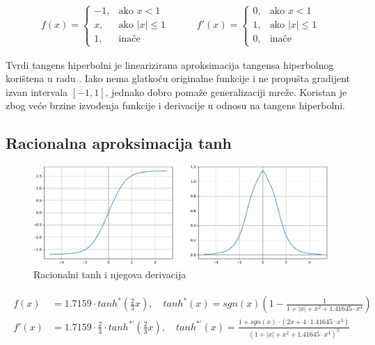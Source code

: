 \documentclass[times, utf8, numeric, diplomski]{fer}
\begin{document}
\begin{equation}
\label{eq:htanh}
\begin{split}
f(x) =
\begin{cases}
-1,	 		& \text{ako } x < 1 \\
x,	 		& \text{ako } |x| \leq 1 \\
1,	& \text{inače}
\end{cases}
\end{split}
\qquad
\begin{split}
f'(x) =
\begin{cases}
0,	 		& \text{ako } x < 1 \\
1,	 		& \text{ako } |x| \leq 1 \\
0,	& \text{inače}
\end{cases}
\end{split}
\end{equation}

Tvrdi tangens hiperbolni je linearizirana aproksimacija tangensa hiperbolnog korištena u radu \citet{collobert_phd}. Iako nema glatkoću originalne funkcije i ne propušta gradijent izvan intervala $[-1,1]$, jednako dobro pomaže generalizaciji mreže. Koristan je zbog veće brzine izvođenja funkcije i derivacije u odnosu na tangens hiperbolni.

\subsection{Racionalna aproksimacija tanh}

\begin{figure}[H]
\includegraphics[width=\textwidth]{Rational_tanh.pdf}
\centering
\caption{Racionalni tanh i njegova derivacija}
\label{fig:rational_tanh}
\end{figure}

\begin{align}
\label{eq:rattanh}
\begin{split}
f(x) &= 1.7159 \cdot tanh^*(\frac{2}{3}x), \quad
tanh^*(x) = sgn(x)(1 - \frac{1}{1 + |x| + x^2 + 1.41645 \cdot x^4}) \\
f'(x) &= 1.7159 \cdot \frac{2}{3} \cdot tanh^{*'}(\frac{2}{3}x), \quad
tanh^{*'}(x) = \frac{1+sgn(x) \cdot (2x + 4 \cdot 1.41645 \cdot x^3)}{(1 + |x| + x^2 + 1.41645 \cdot x^4)^2}
\end{split}
\end{align}
\end{document}
